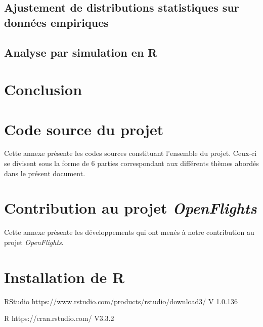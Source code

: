 \documentclass{report}
\begin{document}
\section{Ajustement de distributions statistiques sur données empiriques}
	

\section{Analyse par simulation en R}
	
	
\chapter*{Conclusion}
	




\appendix
\chapter{Code source du projet}
	\label{ann:srcProject}
Cette annexe présente les codes sources constituant l'ensemble du projet. Ceux-ci se divisent sous la forme de 6 parties correspondant aux différents thèmes abordés dans le présent document. \\








\chapter{Contribution au projet \emph{OpenFlights}}
	\label{ann:contribOpenFlights}
Cette annexe présente les développements qui ont menés à notre contribution au projet \emph{OpenFlights}. \\

	

	
\chapter{Installation de R}
	\label{ann:getStarted}
RStudio
https://www.rstudio.com/products/rstudio/download3/
V 1.0.136

R
https://cran.rstudio.com/
V3.3.2
\end{document}
